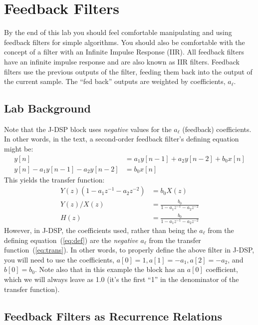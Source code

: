 
\section{Feedback Filters}

By the end of this lab you should feel comfortable manipulating and
using feedback filters for simple algorithms. You should also be
comfortable with the concept of a filter with an Infinite Impulse
Response (IIR). All feedback filters have an infinite impulse response
and are also known as IIR filters. Feedback filters use the previous
outputs of the filter, feeding them back into the output of the
current sample. The ``fed back'' outputs are weighted by coefficients,
$a_\ell$.

\subsection{Lab Background}

Note that the J-DSP  block uses \emph{negative} values
for the $a_\ell$ (feedback) coefficients. In other words, in the text,
a second-order feedback filter's defining equation might be:
\begin{align}
  y[n] &= a_1 y[n-1] + a_2 y[n-2] + b_0 x[n] \label{eq:def} \\
  y[n] -a_1 y[n-1] - a_2 y[n-2]&=   b_0 x[n]
\end{align}
This yields the transfer function:
\begin{align}
  Y(z)(1 - a_1 z^{-1} - a_2 z^{-2}) &= b_0X(z) \\
  Y(z)/X(z) &= \frac{b_0}{1 - a_1 z^{-1} - a_2 z^{-2}} \\
  H(z) &= \frac{b_0}{1 - a_1 z^{-1} - a_2 z^{-2}} \label{eq:trans} 
\end{align}
However, in J-DSP, the coefficients used, rather than being the
$a_\ell$ from the defining equation~(\ref{eq:def}) are the
\emph{negative $a_\ell$} from the transfer
function~(\ref{eq:trans}). In other words, to properly define the above filter in J-DSP,
you will need to use the coefficients, $a[0]=1,a[1]=-a_1,a[2]=-a_2$, and $b[0]=b_0$. 
Note also that in this example the  block has
an $a[0]$ coefficient, which we will always leave as 1.0 (it's the
first ``1'' in the denominator of the transfer function).

\subsection{Feedback Filters as Recurrence Relations}

